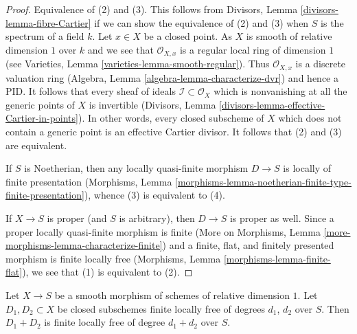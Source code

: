 \begin{proof}
Equivalence of (2) and (3). This follows from
Divisors, Lemma \ref{divisors-lemma-fibre-Cartier}
if we can show the equivalence of (2) and (3) when
$S$ is the spectrum of a field $k$. Let $x \in X$ be a closed point.
As $X$ is smooth of relative dimension $1$ over $k$ and we see that
$\mathcal{O}_{X, x}$ is a regular local ring of dimension $1$
(see Varieties, Lemma \ref{varieties-lemma-smooth-regular}).
Thus $\mathcal{O}_{X, x}$ is a discrete valuation ring
(Algebra, Lemma \ref{algebra-lemma-characterize-dvr})
and hence a PID. It follows that every sheaf of ideals
$\mathcal{I} \subset \mathcal{O}_X$ which is nonvanishing at all
the generic points of $X$ is invertible
(Divisors, Lemma \ref{divisors-lemma-effective-Cartier-in-points}).
In other words, every closed subscheme of $X$ which does not contain
a generic point is an effective Cartier divisor.
It follows that (2) and (3) are equivalent.

\medskip\noindent
If $S$ is Noetherian, then any locally quasi-finite morphism
$D \to S$ is locally of finite presentation (Morphisms, Lemma
\ref{morphisms-lemma-noetherian-finite-type-finite-presentation}),
whence (3) is equivalent to (4).

\medskip\noindent
If $X \to S$ is proper (and $S$ is arbitrary), then $D \to S$ is
proper as well. Since a proper locally quasi-finite morphism is finite
(More on Morphisms, Lemma \ref{more-morphisms-lemma-characterize-finite})
and a finite, flat, and finitely presented morphism is finite locally free
(Morphisms, Lemma \ref{morphisms-lemma-finite-flat}), we see that
(1) is equivalent to (2).
\end{proof}

\begin{lemma}
\label{lemma-sum-divisors-on-curves}
Let $X \to S$ be a smooth morphism of schemes of relative dimension $1$.
Let $D_1, D_2 \subset X$ be closed subschemes finite locally free of
degrees $d_1$, $d_2$ over $S$. Then $D_1 + D_2$ is finite locally free
of degree $d_1 + d_2$ over $S$.
\end{lemma}


